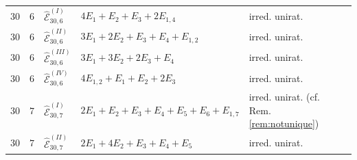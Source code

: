 \documentclass[11pt]{amsart}
\theoremstyle{definition}
\def\E{{\mathcal E}}
\begin{document}
\begin{minipage}[t]{\textwidth/2-1mm}
\begin{flushright}
{\begin{tabular}{ |l | l |l|l|l|l|}
$30$ & $6$ & $\widehat{\E}_{30,6}^{(I)}$ & $4E_1+E_2+E_3+2E_{1,4}$  & irred. unirat.\\
$30$ & $6$ & $\widehat{\E}_{30,6}^{(II)}$ & $3E_1+2E_2+E_3+E_4+E_{1,2}$  & irred. unirat.\\
$30$ & $6$ & $\widehat{\E}_{30,6}^{(III)}$ & $3E_1+3E_2+2E_3+E_4$  & irred. unirat.\\
$30$ & $6$ & $\widehat{\E}_{30,6}^{(IV)}$ & $4E_{1,2}+E_1+E_2+2E_3$  & irred. unirat.\\\hline 

$30$ & $7$ & $\widehat{\E}_{30,7}^{(I)}$ & $2E_1+E_2+E_3+E_4+E_5+E_6+E_{1,7}$ & irred. unirat. (cf. Rem. \ref{rem:notunique})\\
$30$ & $7$ & $\widehat{\E}_{30,7}^{(II)}$ & $2E_1+4E_2+E_3+E_4+E_5$  & irred. unirat. \\\hline
\end{tabular}    
}
\end{flushright}
\end{minipage}
\end{document}

